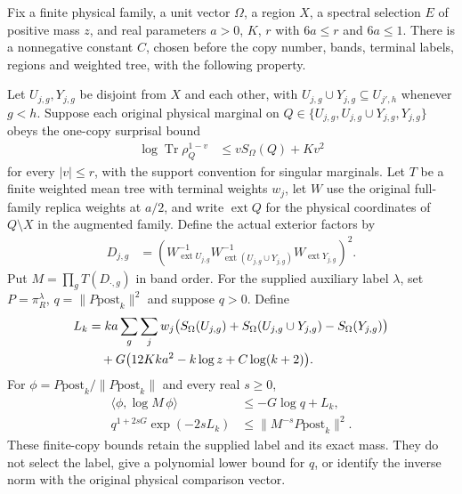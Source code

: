 \begin{theorem}
    \label{thm:selected_bell_post_sharp_tree}
    \leanok
    Fix a finite physical family, a unit vector $\Omega$, a region $X$,
    a spectral selection $E$ of positive mass $z$, and real parameters
    $a>0$, $K$, $r$ with $6a\leq r$ and $6a\leq1$.
    There is a nonnegative constant $C$, chosen before the copy number,
    bands, terminal labels, regions and weighted tree, with the following property.

    Let $U_{j,g},Y_{j,g}$ be disjoint from $X$ and each other, with
    $U_{j,g}\cup Y_{j,g}\subseteq U_{j',h}$ whenever $g<h$.
    Suppose each original physical marginal on
    $Q\in\{U_{j,g},U_{j,g}\cup Y_{j,g},Y_{j,g}\}$ obeys the one-copy
    surprisal bound
    \begin{align}
        \log\operatorname{Tr}\rho_Q^{1-v}
        &\leq vS_\Omega(Q)+Kv^2
    \end{align}
    for every $|v|\leq r$, with the support convention for singular marginals.
    Let $T$ be a finite weighted mean tree with terminal weights $w_j$,
    let $W$ use the original full-family replica weights at $a/2$, and
    write $\operatorname{ext}Q$ for the physical coordinates of $Q\setminus X$
    in the augmented family. Define the actual exterior factors by
    \begin{align}
        D_{j,g}
        &=\left(W_{\operatorname{ext}U_{j,g}}^{-1}
            W_{\operatorname{ext}(U_{j,g}\cup Y_{j,g})}^{-1}
            W_{\operatorname{ext}Y_{j,g}}\right)^2.
    \end{align}
    Put
    $M=\prod_gT(D_{\cdot,g})$ in band order.
    For the supplied auxiliary label $\lambda$, set
    $P=\pi_R^\lambda$, $q=\|P\mathrm{post}_k\|^2$ and suppose $q>0$.
    Define
    \begin{align}
        L_k
        &=ka\sum_g\sum_jw_j
            \bigl(S_\Omega(U_{j,g})+S_\Omega(U_{j,g}\cup Y_{j,g})
                -S_\Omega(Y_{j,g})\bigr)\notag\\
        &\quad+G\bigl(12Kka^2-k\log z+C\log(k+2)\bigr).
    \end{align}
    For $\phi=P\mathrm{post}_k/\|P\mathrm{post}_k\|$ and every real $s\geq0$,
    \begin{align}
        \langle\phi,\log M\,\phi\rangle&\leq-G\log q+L_k,\\
        q^{1+2sG}\exp(-2sL_k)&\leq\|M^{-s}P\mathrm{post}_k\|^2.
    \end{align}
    These finite-copy bounds retain the supplied label and its exact mass.
    They do not select the label, give a polynomial lower bound for $q$,
    or identify the inverse norm with the original physical comparison vector.
\end{theorem}
